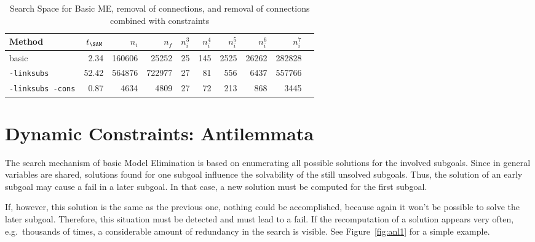 \begin{table}[htb]
\begin{center}
\begin{tabular}{|l|r|r|r||r|r|r|r|r|r|}
\hline
Method & $t_{\SAM}$ & $n_i$ & $n_f$ & 
	$n_i^3$ & $n_i^4$ & $n_i^5$ & $n_i^6$ & $n_i^7$ \\
\hline\hline
basic & 2.34 & 160606 & 25252 &
	25 & 145 & 2525 & 26262 & 282828 \\
\hline
{\tt -linksubs} & 52.42 & 564876 & 722977 &
	27 & 81 & 556 & 6437 & 557766 \\
\hline
{\tt -linksubs -cons} & 0.87 & 4634 & 4809 &
	27 & 72 & 213 & 868 & 3445 \\
\hline\hline
\end{tabular}
\end{center}
\caption{Search Space for Basic ME, removal of connections, and removal of connections
combined with constraints}
\label{tab:tut2:results.linksubs}
\end{table}


\section{Dynamic Constraints: Antilemmata}

The search mechanism of basic Model Elimination is based on enumerating all
possible solutions for the involved subgoals. Since in general
variables are shared, solutions found for one subgoal 
influence the solvability of the still unsolved subgoals. Thus,
the solution of an early subgoal may cause a fail in a later subgoal. 
In that case, a new solution must be computed for the first subgoal.

If, however, this solution is the same as the previous one,
nothing could be accomplished, because again it won't be possible to
solve the later subgoal.
Therefore, this situation must be detected and must lead to a fail.
If the recomputation of a solution
appears very often, e.g.\ thousands of times, 
a considerable amount of redundancy in the search is visible. 
See Figure~\ref{fig:anl1} for a simple example. 

%


